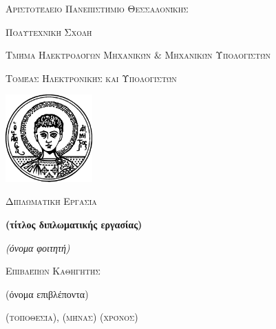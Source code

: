 \begin{titlepage}
	\centering
	{\scshape\Large Αριστοτέλειο Πανεπιστήμιο Θεσσαλονίκης \par}
	{\scshape\Large Πολυτεχνική Σχολή \par}
	\vspace{0.2cm}
    {\scshape\large Τμήμα Ηλεκτρολόγων Μηχανικών $\&$ Μηχανικών Υπολογιστών \par}
	{\scshape\large Τομέας Ηλεκτρονικής και Υπολογιστών \par}
	\vspace{0.5cm}
	\includegraphics[width=0.25\textwidth]{assets/images/auth_logo_black.eps} \par
	\vspace{1cm}
	{\scshape\Large Διπλωματική Εργασία \par}
	\vspace{0.3cm}
	{\huge\bfseries (τίτλος διπλωματικής εργασίας) \par}
	\vspace{2cm}
	{\Large\itshape (όνομα φοιτητή) \par}
	\vfill
	{\scshape\large Επιβλέπων Καθηγητής \par}
	{\large (όνομα επιβλέποντα)}
	\vfill
	{\scshape\large (τοποθεσία), (μήνας) (χρόνος)\par}
\end{titlepage}
